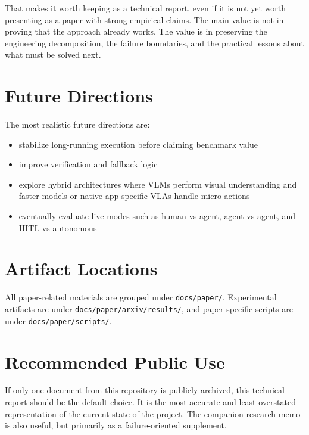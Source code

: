 \documentclass[11pt]{article}
\begin{document}
That makes it worth keeping as a technical report, even if it is not yet worth presenting as a paper with strong empirical claims. The main value is not in proving that the approach already works. The value is in preserving the engineering decomposition, the failure boundaries, and the practical lessons about what must be solved next.

\section{Future Directions}

The most realistic future directions are:
\begin{itemize}[leftmargin=*]
    \item stabilize long-running execution before claiming benchmark value
    \item improve verification and fallback logic
    \item explore hybrid architectures where VLMs perform visual understanding and faster models or native-app-specific VLAs handle micro-actions
    \item eventually evaluate live modes such as human vs agent, agent vs agent, and HITL vs autonomous
\end{itemize}

\section{Artifact Locations}

All paper-related materials are grouped under \texttt{docs/paper/}. Experimental artifacts are under \texttt{docs/paper/arxiv/results/}, and paper-specific scripts are under \texttt{docs/paper/scripts/}.

\section{Recommended Public Use}

If only one document from this repository is publicly archived, this technical report should be the default choice. It is the most accurate and least overstated representation of the current state of the project. The companion research memo is also useful, but primarily as a failure-oriented supplement.
\end{document}
